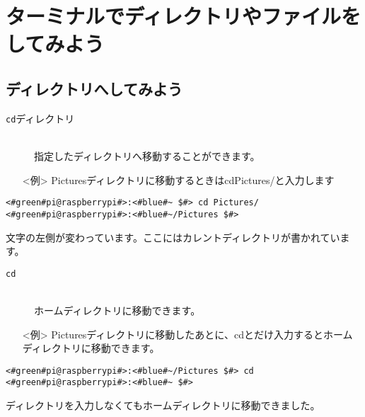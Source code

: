 \section{ターミナルでディレクトリやファイルをしてみよう}

\subsection{ディレクトリへしてみよう}
\begin{description}
\item[\texttt{cd}\textvisiblespace ディレクトリ]\mbox{}\\
指定したディレクトリへ移動することができます。
\end{description}
\begin{itemize}
\item[<例>] Picturesディレクトリに移動するときはcd\textvisiblespace Pictures/と入力します
\end{itemize}

\begin{lstlisting}[caption=cd directoryの例, label=cdDir]
<#green#pi@raspberrypi#>:<#blue#~ $#> cd Pictures/
<#green#pi@raspberrypi#>:<#blue#~/Pictures $#>
\end{lstlisting}
文字の左側が変わっています。ここにはカレントディレクトリが書かれています。

\begin{description}
\item[\texttt{cd}]\mbox{}\\
ホームディレクトリに移動できます。
\end{description}
\begin{itemize}
\item[<例>] Picturesディレクトリに移動したあとに、cdとだけ入力するとホームディレクトリに移動できます。
\end{itemize}
\begin{lstlisting}[caption=cdの例, label=cd]
<#green#pi@raspberrypi#>:<#blue#~/Pictures $#> cd
<#green#pi@raspberrypi#>:<#blue#~ $#> 
\end{lstlisting}
ディレクトリを入力しなくてもホームディレクトリに移動できました。\\

\begin{tcolorbox}[title=\useOmetoi]
\begin{enumerate}
\end{enumerate}
\end{tcolorbox}
